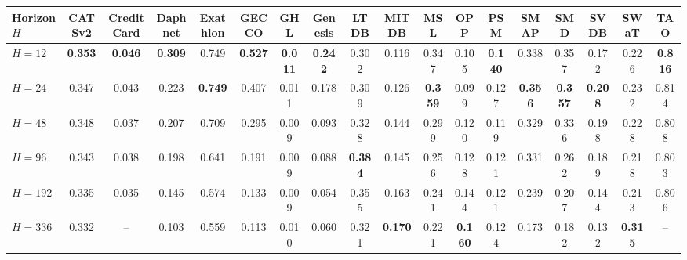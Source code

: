 \documentclass[border=2pt]{standalone}
\begin{document}
\renewcommand{\arraystretch}{1.1}
\setlength{\tabcolsep}{3pt}
\footnotesize

\begin{tabular}{l|ccccccccccccccccc}
\toprule
\textbf{Horizon $H$} & \textbf{CATSv2} & \textbf{CreditCard} & \textbf{Daphnet} & \textbf{Exathlon} & \textbf{GECCO} & \textbf{GHL} & \textbf{Genesis} & \textbf{LTDB} & \textbf{MITDB} & \textbf{MSL} & \textbf{OPP} & \textbf{PSM} & \textbf{SMAP} & \textbf{SMD} & \textbf{SVDB} & \textbf{SWaT} & \textbf{TAO} \\
\midrule
\textbf{$H=12$} & \textbf{0.353} & \textbf{0.046} & \textbf{0.309} & 0.749 & \textbf{0.527} & \textbf{0.011} & \textbf{0.242} & 0.302 & 0.116 & 0.347 & 0.105 & \textbf{0.140} & 0.338 & 0.357 & 0.172 & 0.226 & \textbf{0.816} \\
\textbf{$H=24$} & 0.347 & 0.043 & 0.223 & \textbf{0.749} & 0.407 & 0.011 & 0.178 & 0.309 & 0.126 & \textbf{0.359} & 0.099 & 0.127 & \textbf{0.356} & \textbf{0.357} & \textbf{0.208} & 0.232 & 0.814 \\
\textbf{$H=48$} & 0.348 & 0.037 & 0.207 & 0.709 & 0.295 & 0.009 & 0.093 & 0.328 & 0.144 & 0.299 & 0.120 & 0.119 & 0.329 & 0.336 & 0.198 & 0.228 & 0.808 \\
\textbf{$H=96$} & 0.343 & 0.038 & 0.198 & 0.641 & 0.191 & 0.009 & 0.088 & \textbf{0.384} & 0.145 & 0.256 & 0.128 & 0.121 & 0.331 & 0.262 & 0.189 & 0.218 & 0.803 \\
\textbf{$H=192$} & 0.335 & 0.035 & 0.145 & 0.574 & 0.133 & 0.009 & 0.054 & 0.355 & 0.163 & 0.241 & 0.144 & 0.121 & 0.239 & 0.207 & 0.144 & 0.213 & 0.806 \\
\textbf{$H=336$} & 0.332 & -- & 0.103 & 0.559 & 0.113 & 0.010 & 0.060 & 0.321 & \textbf{0.170} & 0.221 & \textbf{0.160} & 0.124 & 0.173 & 0.182 & 0.132 & \textbf{0.315} & -- \\
\bottomrule
\end{tabular}
\end{document}
